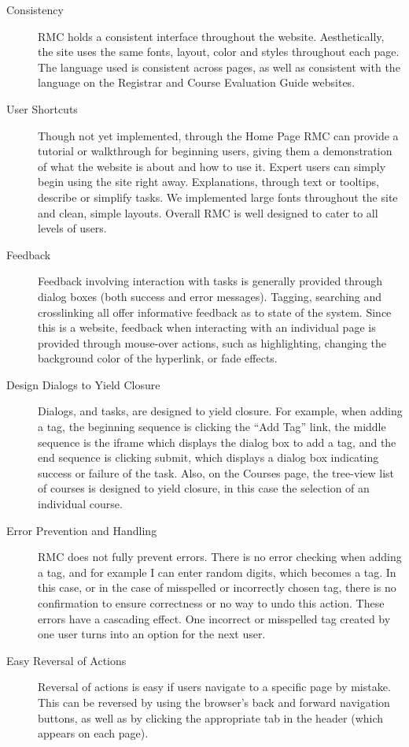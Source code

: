 \documentclass[12pt]{report}
\begin{document}
\begin{description}
\item[Consistency] RMC holds a consistent interface throughout the website. Aesthetically, the site uses the same fonts, layout, color and styles throughout each page. The language used is consistent across pages, as well as consistent with the language on the Registrar and Course Evaluation Guide websites.
\item[User Shortcuts] Though not yet implemented, through the Home Page RMC can provide a tutorial or walkthrough for beginning users, giving them a demonstration of what the website is about and how to use it. Expert users can simply begin using the site right away. Explanations, through text or tooltips, describe or simplify tasks. We implemented large fonts throughout the site and clean, simple layouts. Overall RMC is well designed to cater to all levels of users.
\item[Feedback] Feedback involving interaction with tasks is generally provided through dialog boxes (both success and error messages). Tagging, searching and crosslinking all offer informative feedback as to state of the system. Since this is a website, feedback when interacting with an individual page is provided through mouse-over actions, such as highlighting, changing the background color of the hyperlink, or fade effects.
\item[Design Dialogs to Yield Closure] Dialogs, and tasks, are designed to yield closure. For example, when adding a tag, the beginning sequence is clicking the “Add Tag” link, the middle sequence is the iframe which displays the dialog box to add a tag, and the end sequence is clicking submit, which displays a dialog box indicating success or failure of the task. Also, on the Courses page, the tree-view list of courses is designed to yield closure, in this case the selection of an individual course.
\item[Error Prevention and Handling] RMC does not fully prevent errors. There is no error checking when adding a tag, and for example I can enter random digits, which becomes a tag. In this case, or in the case of misspelled or incorrectly chosen tag, there is no confirmation to ensure correctness or no way to undo this action. These errors have a cascading effect. One incorrect or misspelled tag created by one user turns into an option for the next user.
\item[Easy Reversal of Actions] Reversal of actions is easy if users navigate to a specific page by mistake. This can be reversed by using the browser’s back and forward navigation buttons, as well as by clicking the appropriate tab in the header (which appears on each page).

\end{description}
\end{document}
